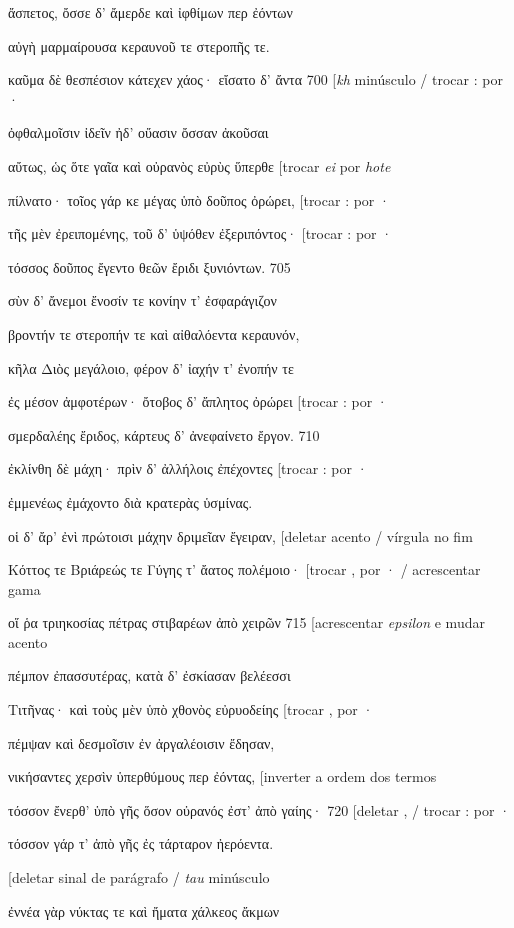 ἄσπετος, ὄσσε δ' ἄμερδε καὶ ἰφθίμων περ ἐόντων

αὐγὴ μαρμαίρουσα κεραυνοῦ τε στεροπῆς τε.

καῦμα δὲ θεσπέσιον κάτεχεν χάος· εἴσατο δ' ἄντα 700 {[}\emph{kh}
minúsculo / trocar : por ·

ὀφθαλμοῖσιν ἰδεῖν ἠδ' οὔασιν ὄσσαν ἀκοῦσαι

αὔτως, ὡς ὅτε γαῖα καὶ οὐρανὸς εὐρὺς ὕπερθε {[}trocar \emph{ei} por
\emph{hote}

πίλνατο· τοῖος γάρ κε μέγας ὑπὸ δοῦπος ὀρώρει, {[}trocar : por ·

τῆς μὲν ἐρειπομένης, τοῦ δ' ὑψόθεν ἐξεριπόντος· {[}trocar : por ·

τόσσος δοῦπος ἔγεντο θεῶν ἔριδι ξυνιόντων. 705

σὺν δ' ἄνεμοι ἔνοσίν τε κονίην τ' ἐσφαράγιζον

βροντήν τε στεροπήν τε καὶ αἰθαλόεντα κεραυνόν,

κῆλα Διὸς μεγάλοιο, φέρον δ' ἰαχήν τ' ἐνοπήν τε

ἐς μέσον ἀμφοτέρων· ὄτοβος δ' ἄπλητος ὀρώρει {[}trocar : por ·

σμερδαλέης ἔριδος, κάρτευς δ' ἀνεφαίνετο ἔργον. 710

ἐκλίνθη δὲ μάχη· πρὶν δ' ἀλλήλοις ἐπέχοντες {[}trocar : por ·

ἐμμενέως ἐμάχοντο διὰ κρατερὰς ὑσμίνας.

οἱ δ' ἄρ' ἐνὶ πρώτοισι μάχην δριμεῖαν ἔγειραν, {[}deletar acento /
vírgula no fim

Κόττος τε Βριάρεώς τε Γύγης τ' ἄατος πολέμοιο· {[}trocar , por · /
acrescentar gama

οἵ ῥα τριηκοσίας πέτρας στιβαρέων ἀπὸ χειρῶν 715 {[}acrescentar
\emph{epsilon} e mudar acento

πέμπον ἐπασσυτέρας, κατὰ δ' ἐσκίασαν βελέεσσι

Τιτῆνας· καὶ τοὺς μὲν ὑπὸ χθονὸς εὐρυοδείης {[}trocar , por ·

πέμψαν καὶ δεσμοῖσιν ἐν ἀργαλέοισιν ἔδησαν,

νικήσαντες χερσὶν ὑπερθύμους περ ἐόντας, {[}inverter a ordem dos termos

τόσσον ἔνερθ' ὑπὸ γῆς ὅσον οὐρανός ἐστ' ἀπὸ γαίης· 720 {[}deletar , /
trocar : por ·

τόσσον γάρ τ' ἀπὸ γῆς ἐς τάρταρον ἠερόεντα.

{[}deletar sinal de parágrafo / \emph{tau} minúsculo

ἐννέα γὰρ νύκτας τε καὶ ἤματα χάλκεος ἄκμων

